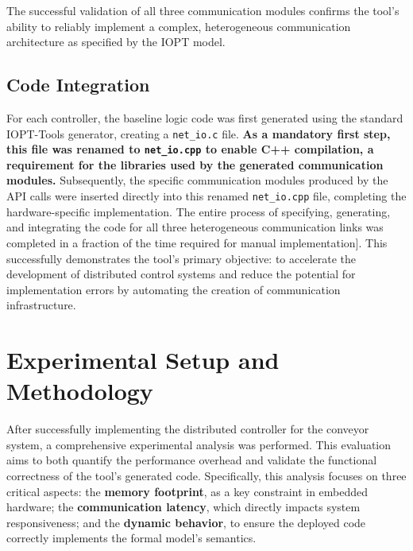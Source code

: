 The successful validation of all three communication modules confirms the tool's ability to reliably implement a complex, heterogeneous communication architecture as specified by the IOPT model.


\subsection{Code Integration}
\label{subsec:code_integration}

For each controller, the baseline logic code was first generated using the standard IOPT-Tools generator, creating a \texttt{net\_io.c} file. \textbf{As a mandatory first step, this file was renamed to \texttt{net\_io.cpp} to enable C++ compilation, a requirement for the libraries used by the generated communication modules.} Subsequently, the specific communication modules produced by the API calls were inserted directly into this renamed \texttt{net\_io.cpp} file, completing the hardware-specific implementation. The entire process of specifying, generating, and integrating the code for all three heterogeneous communication links was completed in a fraction of the time required for manual implementation]. This successfully demonstrates the tool's primary objective: to accelerate the development of distributed control systems and reduce the potential for implementation errors by automating the creation of communication infrastructure.

\section{Experimental Setup and Methodology}
\label{sec:setup_and_methodology}

After successfully implementing the distributed controller for the conveyor system, a comprehensive experimental analysis was performed. This evaluation aims to both quantify the performance overhead and validate the functional correctness of the tool's generated code. Specifically, this analysis focuses on three critical aspects: the \textbf{memory footprint}, as a key constraint in embedded hardware; the \textbf{communication latency}, which directly impacts system responsiveness; and the \textbf{dynamic behavior}, to ensure the deployed code correctly implements the formal model's semantics.


